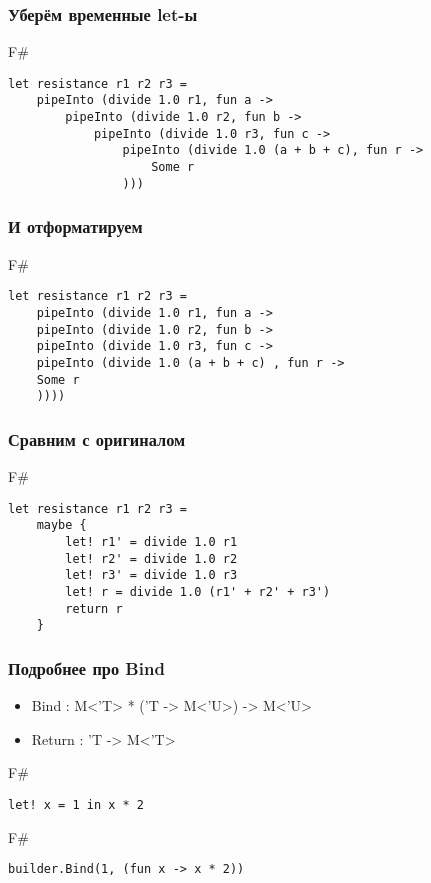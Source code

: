 \documentclass[xetex,mathserif,serif]{beamer}
\begin{document}
	\begin{frame}[fragile]
		\frametitle{Уберём временные let-ы}
   		\begin{exampleblock}{F\#}
   			\begin{lstlisting}
let resistance r1 r2 r3 = 
    pipeInto (divide 1.0 r1, fun a ->
        pipeInto (divide 1.0 r2, fun b ->
            pipeInto (divide 1.0 r3, fun c ->
                pipeInto (divide 1.0 (a + b + c), fun r ->
                    Some r
                )))
\end{lstlisting}
\end{exampleblock}
\end{frame}

	\begin{frame}[fragile]
		\frametitle{И отформатируем}
   		\begin{exampleblock}{F\#}
   			\begin{lstlisting}
let resistance r1 r2 r3 = 
    pipeInto (divide 1.0 r1, fun a ->
    pipeInto (divide 1.0 r2, fun b ->
    pipeInto (divide 1.0 r3, fun c ->
    pipeInto (divide 1.0 (a + b + c) , fun r ->
    Some r
    ))))
\end{lstlisting}
\end{exampleblock}
\end{frame}

	\begin{frame}[fragile]
		\frametitle{Сравним с оригиналом}
   		\begin{exampleblock}{F\#}
   			\begin{lstlisting}
let resistance r1 r2 r3 = 
    maybe {
        let! r1' = divide 1.0 r1
        let! r2' = divide 1.0 r2
        let! r3' = divide 1.0 r3
        let! r = divide 1.0 (r1' + r2' + r3')
        return r
    }
\end{lstlisting}
\end{exampleblock}
\end{frame}

	\begin{frame}[fragile]
		\frametitle{Подробнее про Bind}
		\begin{itemize}
    		\item Bind : M<'T> * ('T -> M<'U>) -> M<'U>
    		\item Return : 'T -> M<'T>
		\end{itemize}
   		\begin{exampleblock}{F\#}
   			\begin{lstlisting}
let! x = 1 in x * 2
\end{lstlisting}
\end{exampleblock}
   		\begin{exampleblock}{F\#}
   			\begin{lstlisting}
builder.Bind(1, (fun x -> x * 2))
\end{lstlisting}
\end{exampleblock}
\end{frame}
\end{document}
